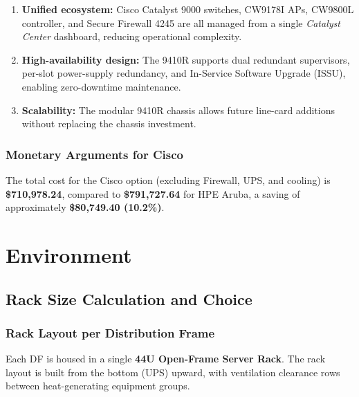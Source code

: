 \documentclass[12pt,a4paper]{report}
\begin{document}
\begin{enumerate}[noitemsep]
  \item \textbf{Unified ecosystem:} Cisco Catalyst 9000 switches, CW9178I APs,
    CW9800L controller, and Secure Firewall 4245 are all managed from a single
    \textit{Catalyst Center} dashboard, reducing operational complexity.
    \vspace{1em}
  \item \textbf{High-availability design:} The 9410R supports dual redundant
    supervisors, per-slot power-supply redundancy, and In-Service Software Upgrade (ISSU),
    enabling zero-downtime maintenance.
      \vspace{1em}


  \item \textbf{Scalability:} The modular 9410R chassis allows future line-card
    additions without replacing the chassis investment.
          \vspace{1em}


\end{enumerate}

\subsection*{Monetary Arguments for Cisco}

The total cost for the Cisco option (excluding Firewall, UPS, and cooling) is
\textbf{\$710{,}978.24}, compared to \textbf{\$791{,}727.64} for HPE Aruba, a saving of approximately \textbf{\$80{,}749.40 (10.2\%)}.


\chapter{Environment}
\label{chap:environment}

\section{Rack Size Calculation and Choice}

\subsection{Rack Layout per Distribution Frame}

Each DF is housed in a single \textbf{44U Open-Frame Server Rack}.
The rack layout is built from the bottom (UPS) upward, with ventilation
clearance rows between heat-generating equipment groups.
\end{document}
